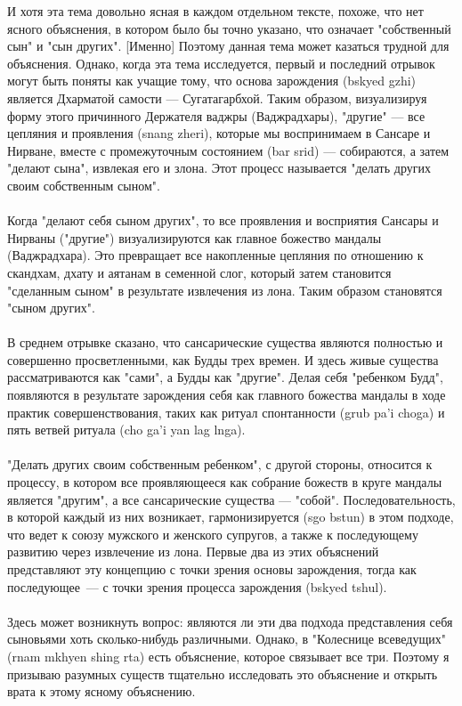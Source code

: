 \begin{siderules}
И хотя эта тема довольно ясная в каждом отдельном тексте, похоже, что нет ясного
объяснения, в котором было бы точно указано, что означает "собственный сын" и "сын
других". [Именно] Поэтому данная тема может казаться трудной для объяснения.
Однако, когда эта тема исследуется, первый и последний отрывок могут быть поняты как учащие
тому, что основа зарождения (bskyed gzhi) является Дхарматой самости — Сугатагарбхой.
Таким образом, визуализируя форму этого причинного Держателя ваджры (Ваджрадхары),
"другие" — все цепляния и проявления (snang zheri), которые мы воспринимаем в Сансаре и
Нирване, вместе с промежуточным состоянием (bar srid) — собираются, а затем
"делают сына", извлекая его и злона. Этот процесс называется "делать других
своим собственным сыном".\\
\\
Когда "делают себя сыном других", то все проявления и восприятия Сансары и Нирваны
("другие") визуализируются как главное божество мандалы (Ваджрадхара). Это превращает
все накопленные цепляния по отношению к скандхам, дхату и аятанам в семенной слог,
который затем становится "сделанным сыном" в результате извлечения из лона. Таким
образом становятся "сыном других".\\
\\
В среднем отрывке сказано, что сансарические существа являются полностью и совершенно
просветленными, как Будды трех времен. И здесь живые существа рассматриваются как
"сами", а Будды как "другие". Делая себя "ребенком Будд", появляются в результате
зарождения себя как главного божества мандалы в ходе практик совершенствования,
таких как ритуал спонтанности (grub pa'i choga) и пять ветвей ритуала (cho ga'i yan lag lnga).\\
\\
"Делать других своим собственным ребенком", с другой стороны, относится к процессу,
в котором все проявляющееся как собрание божеств в круге мандалы является "другим",
а все сансарические существа — "собой". Последовательность, в которой каждый из них возникает,
гармонизируется (sgo bstun) в этом подходе, что ведет к союзу мужского и женского
супругов, а также к последующему развитию через извлечение из лона. Первые два из этих
объяснений представляют эту концепцию с точки зрения основы зарождения, тогда как
последующее — с точки зрения процесса зарождения (bskyed tshul).\\
\\
Здесь может возникнуть вопрос: являются ли эти два подхода представления себя сыновьями
хоть сколько-нибудь различными. Однако, в "Колеснице всеведущих" (rnam mkhyen shing
rta) есть объяснение, которое связывает все три. Поэтому я призываю разумных существ
тщательно исследовать это объяснение и открыть врата к этому ясному объяснению.
\end{siderules}

